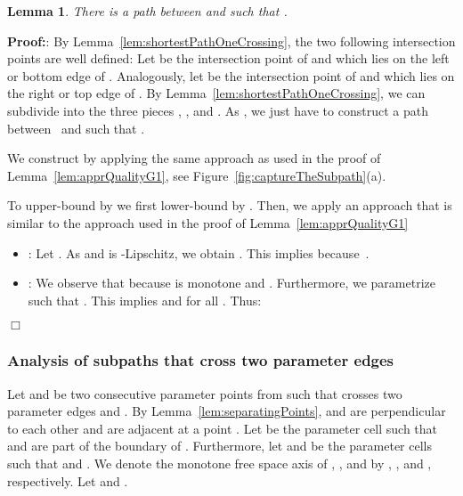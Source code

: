 \documentclass[a4paper,11pt]{article}
\newtheorem{lemma}{Lemma}
\newenvironment{proof}{\textbf{Proof:}}{\hspace*{0mm}\hfill\ensuremath{\Box}}
\begin{document}
\begin{lemma}\label{lem:shortestPathOneCrossingAppr}
	There is a path  between  and  such that .
\end{lemma}
\begin{proof}: By Lemma~\ref{lem:shortestPathOneCrossing}, the two following intersection points are well defined: Let  be the intersection point of  and  which lies on the left or bottom edge of . Analogously, let  be the intersection point of  and  which lies on the right or top edge of . By Lemma~\ref{lem:shortestPathOneCrossing}, we can subdivide  into the three pieces , , and . As , we just have to construct a path  between~ and  such that .
	
	We construct  by applying the same approach as used in the proof of Lemma~\ref{lem:apprQualityG1}, see Figure~\ref{fig:captureTheSubpath}(a).
	
	To upper-bound  by  we first lower-bound  by . Then, we apply an approach that is similar to the approach used in the proof of Lemma~\ref{lem:apprQualityG1} 
	\begin{itemize}
		\item : Let . As  and  is -Lipschitz, we obtain . This implies  because~.
		\item : We observe that   because  is monotone and . Furthermore, we parametrize  such that . This implies   and   for all . Thus:
			
	\end{itemize}
\end{proof}
\subsubsection{Analysis of subpaths that cross two parameter edges}\label{subsec:anaTwoCrossing}
	Let  and  be two consecutive parameter points from  such that  crosses two parameter edges  and . By Lemma~\ref{lem:separatingPoints},  and  are perpendicular to each other and are adjacent at a point . Let  be the parameter cell such that  and  are part of the boundary of . Furthermore, let  and  be the parameter cells such that  and . We denote the monotone free space axis of , , and  by , , and , respectively. Let  and .
\end{document}
